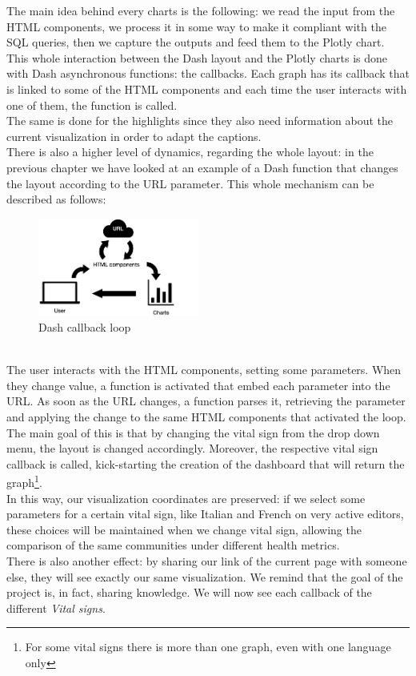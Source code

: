The main idea behind every charts is the following: we read the input from the HTML components, we process it in some way to make it compliant with the SQL queries, then we capture the outputs and feed them to the Plotly chart.\\
This whole interaction between the Dash layout and the Plotly charts is done with Dash asynchronous functions: the callbacks. Each graph has its callback that is linked to some of the HTML components and each time the user interacts with one of them, the function is called.\\
The same is done for the highlights since they also need information about the current visualization in order to adapt the captions.\\
There is also a higher level of dynamics, regarding the whole layout: in the previous chapter we have looked at an example of a Dash function that changes the layout according to the URL parameter. This whole mechanism can be described as follows:
\pagebreak
\begin{figure}[h]
    \centering
    \includegraphics[width=200px]{img/callback-loop.png}
    \caption{Dash callback loop}
    \label{fig:callback_loop}
\end{figure}
\\
The user interacts with the HTML components, setting some parameters. When they change value, a function is activated that embed each parameter into the URL. As soon as the URL changes, a function parses it, retrieving the parameter and applying the change to the same HTML components that activated the loop. The main goal of this is that by changing the vital sign from the drop down menu, the layout is changed accordingly. Moreover, the respective vital sign callback is called, kick-starting the creation of the dashboard that will return the graph\footnote{For some vital signs there is more than one graph, even with one language only}. \\
In this way, our visualization coordinates are preserved: if we select some parameters for a certain vital sign, like Italian and French on very active editors, these choices will be maintained when we change vital sign, allowing the comparison of the same communities under different health metrics.\\
There is also another effect: by sharing our link of the current page with someone else, they will see exactly our same visualization. We remind that the goal of the project is, in fact, sharing knowledge.
We will now see each callback of the different \textit{Vital signs}.

